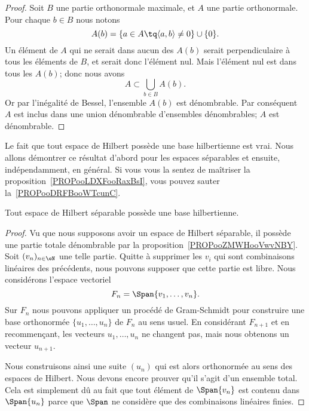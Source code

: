 \begin{proof}
	Soit \( B\) une partie orthonormale maximale, et \( A\) une partie orthonormale. Pour chaque \( b\in B\) nous notons
	\begin{equation}
		A(b)=\{ a\in A\tq \langle a, b\rangle \neq 0 \}\cup\{ 0 \}.
	\end{equation}
	Un élément de \( A\) qui ne serait dans aucun des \( A(b)\) serait perpendiculaire à tous les éléments de \( B\), et serait donc l'élément nul. Mais l'élément nul est dans tous les \( A(b)\); donc nous avons
	\begin{equation}
		A\subset\bigcup_{b\in B}A(b).
	\end{equation}
	Or par l'inégalité de Bessel, l'ensemble \( A(b)\) est dénombrable. Par conséquent \( A\) est inclus dans une union dénombrable d'ensembles dénombrables; \( A\) est dénombrable.
\end{proof}

Le fait que tout espace de Hilbert possède une base hilbertienne est vrai. Nous allons démontrer ce résultat d'abord pour les espaces séparables et ensuite, indépendamment, en général. Si vous vous la sentez de maîtriser la proposition~\ref{PROPooLDXFooRaxBsI}, vous pouvez sauter la~\ref{PROPooDRFBooWTcunC}.
\begin{proposition}     \label{PROPooDRFBooWTcunC}
	Tout espace de Hilbert séparable possède une base hilbertienne.
\end{proposition}

\begin{proof}
	Vu que nous supposons avoir un espace de Hilbert séparable, il possède une partie totale dénombrable par la proposition~\ref{PROPooZMWHooVwvNBY}. Soit  \( (v_n)_{n\in \eN}\) une telle partie. Quitte à supprimer les \( v_i\) qui sont combinaisons linéaires des précédents, nous pouvons supposer que cette partie est libre. Nous considérons l'espace vectoriel
	\begin{equation}
		F_n=\Span\{ v_1,\ldots, v_n \}.
	\end{equation}
	Sur \( F_n\) nous pouvons appliquer un procédé de Gram-Schmidt pour construire une base orthonormée \( \{ u_1,\ldots, u_n \}\) de \( F_n\) au sens usuel. En considérant \( F_{n+1}\) et en recommençant, les vecteurs \( u_1,\ldots, u_n\) ne changent pas, mais nous obtenons un vecteur \( u_{n+1}\).

	Nous construisons ainsi une suite \( (u_n)\) qui est alors orthonormée au sens des espaces de Hilbert. Nous devons encore prouver qu'il s'agit d'un ensemble total. Cela est simplement dû au fait que tout élément de \( \Span\{ v_n \}\) est contenu dans \( \Span\{ u_n \}\) parce que \( \Span\) ne considère que des combinaisons linéaires finies.
\end{proof}

